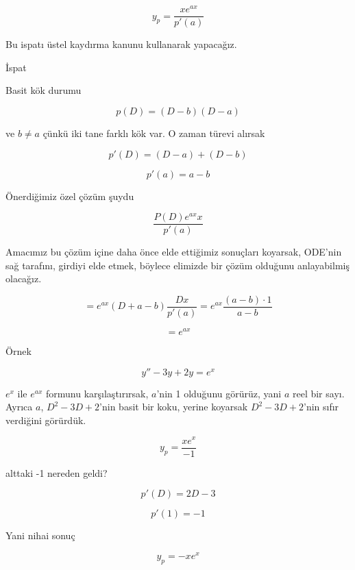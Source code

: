\documentclass[12pt,fleqn]{article}\usepackage{../../common}
\begin{document}
$$ y_p = \frac{x e^{ax}}{p'(a)} $$

Bu ispatı üstel kaydırma kanunu kullanarak yapacağız. 

İspat

Basit kök durumu

$$ p(D) = (D-b)(D-a) $$

ve $b \ne a$ çünkü iki tane farklı kök var. O zaman türevi alırsak

$$ p'(D) = (D-a) + (D-b) $$

$$ p'(a) = a-b $$

Önerdiğimiz özel çözüm şuydu

$$ \frac{P(D) e^{ax} x}{p'(a)} $$

Amacımız bu çözüm içine daha önce elde ettiğimiz sonuçları koyarsak,
ODE'nin sağ tarafını, girdiyi elde etmek, böylece elimizde bir çözüm
olduğunu anlayabilmiş olacağız. 

$$ = e^{ax}(D+a-b)\frac{Dx}{p'(a)} = e^{ax} \frac{(a-b) \cdot 1}{a-b} $$

$$ = e^{ax} $$

Örnek

$$ y'' - 3y + 2y = e^x $$

$e^x$ ile $e^{ax}$ formunu karşılaştırırsak, $a$'nin 1 olduğunu görürüz,
yani $a$ reel bir sayı. Ayrıca $a$, $D^2-3D+2$'nin basit bir koku, yerine
koyarsak $D^2-3D+2$'nin sıfır verdiğini görürdük. 

$$ y_p = \frac{xe^x}{-1} $$

alttaki -1 nereden geldi? 

$$ p'(D) = 2D - 3 $$

$$ p'(1) = -1 $$

Yani nihai sonuç

$$ y_p = -xe^x $$
\end{document}
